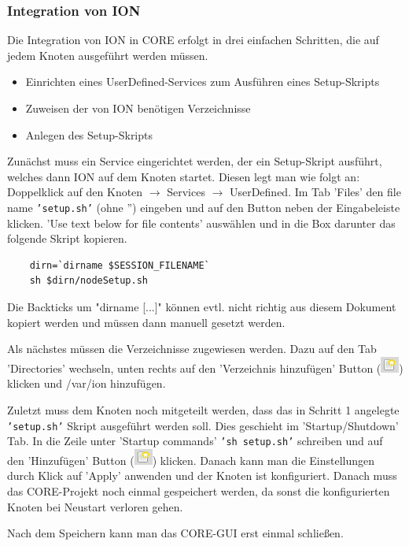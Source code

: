 \documentclass{article}
\begin{document}
\subsubsection{Integration von ION}
Die Integration von ION in CORE erfolgt in drei einfachen Schritten, die auf jedem Knoten ausgeführt werden müssen.
\begin{itemize}
\item Einrichten eines UserDefined-Services zum Ausführen eines Setup-Skripts
\item Zuweisen der von ION benötigen Verzeichnisse
\item Anlegen des Setup-Skripts
\end{itemize}\par
Zunächst muss ein Service eingerichtet werden, der ein Setup-Skript ausführt, welches dann ION auf dem Knoten startet. Diesen legt man wie folgt an: Doppelklick auf den Knoten $\rightarrow$ Services $\rightarrow$ UserDefined. Im Tab 'Files' den file name \texttt{'setup.sh'} (ohne '') eingeben und auf den Button neben der Eingabeleiste klicken. 'Use text below for file contents' auswählen und in die Box darunter das folgende Skript kopieren.
\begin{verbatim}
    dirn=`dirname $SESSION_FILENAME`
    sh $dirn/nodeSetup.sh
\end{verbatim}
Die Backticks um "dirname [...]" können evtl. nicht richtig aus diesem Dokument kopiert werden und müssen dann manuell gesetzt werden.\par
Als nächstes müssen die Verzeichnisse zugewiesen werden. Dazu auf den Tab 'Directories' wechseln, unten rechts auf den 'Verzeichnis hinzufügen' Button (\includegraphics[height=\fontcharht\font`\B]{new}) klicken und /var/ion hinzufügen.\par
Zuletzt muss dem Knoten noch mitgeteilt werden, dass das in Schritt 1 angelegte \texttt{'setup.sh'} Skript ausgeführt werden soll. Dies geschieht im 'Startup/Shutdown' Tab. In die Zeile unter 'Startup commands' \texttt{'sh setup.sh'} schreiben und auf den 'Hinzufügen' Button (\includegraphics[height=\fontcharht\font`\B]{new}) klicken. Danach kann man die Einstellungen durch Klick auf 'Apply' anwenden und der Knoten ist konfiguriert. Danach muss das CORE-Projekt noch einmal gespeichert werden, da sonst die konfigurierten Knoten bei Neustart verloren gehen.\par
Nach dem Speichern kann man das CORE-GUI erst einmal schließen.
\end{document}

